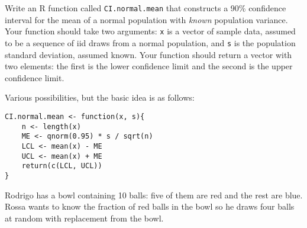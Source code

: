 \documentclass[addpoints,12pt]{exam}
\begin{document}
\begin{questions}
\question[20] Write an R function called \texttt{CI.normal.mean} that constructs a 90\% confidence interval for the mean of a normal population with \emph{known} population variance. Your function should take two arguments: \texttt{x} is a vector of sample data, assumed to be a sequence of iid draws from a normal population, and \texttt{s} is the population standard deviation, assumed known. Your function should return a vector with two elements: the first is the lower confidence limit and the second is the upper confidence limit.
	\begin{solution}[2.75in]
	Various possibilities, but the basic idea is as follows:
\begin{verbatim}
CI.normal.mean <- function(x, s){
	n <- length(x)
	ME <- qnorm(0.95) * s / sqrt(n)
	LCL <- mean(x) - ME
	UCL <- mean(x) + ME
	return(c(LCL, UCL))
}		
\end{verbatim}	
	\end{solution}

\question Rodrigo has a bowl containing 10 balls: five of them are red and the rest are blue. Rossa wants to know the fraction of red balls in the bowl so he draws four balls at random with replacement from the bowl.
\end{questions}
\end{document}
